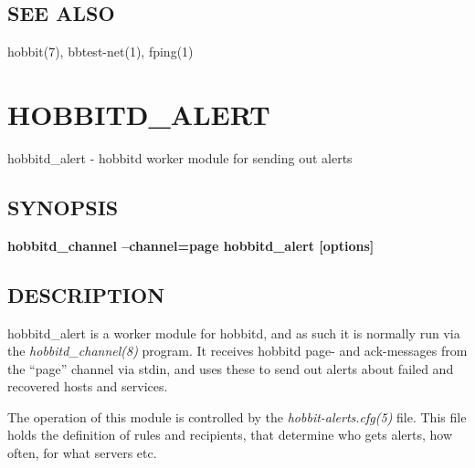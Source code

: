 \subsection{SEE ALSO}
hobbit(7), bbtest-net(1), fping(1) 

 
%
\newpage
\section{HOBBITD\_ALERT}

 hobbitd\_alert - hobbitd worker module for sending out alerts

 \subsection{SYNOPSIS}
\textbf{hobbitd\_channel --channel=page hobbitd\_alert [options]}


 
\subsection{DESCRIPTION}
 hobbitd\_alert is a worker module for hobbitd, and as such it is
 normally run via the \emph{hobbitd\_channel(8)} program. It receives
 hobbitd page- and ack-messages from the ``page'' channel via stdin,
 and uses these to send out alerts about failed and recovered hosts
 and services. 


  The operation of this module is controlled by the
  \emph{hobbit-alerts.cfg(5)} file. This file holds the definition of
  rules and recipients, that determine who gets alerts, how often, for
  what servers etc. 



 
